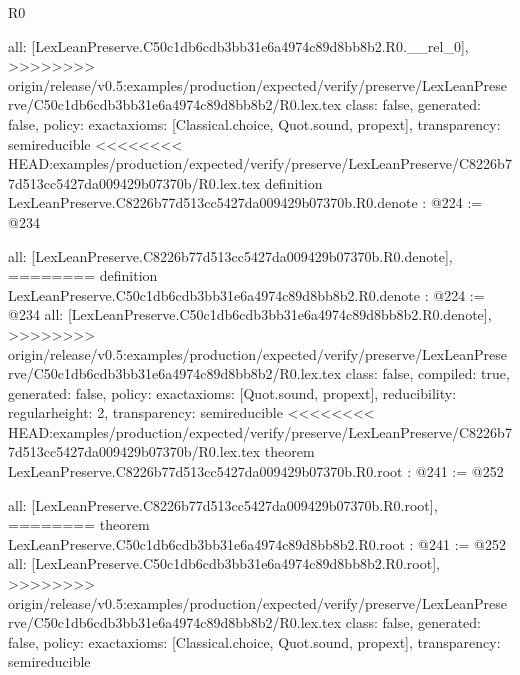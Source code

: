 \begin{lexlean}{R0}
\begin{coremodule}
{{{{  all: [LexLeanPreserve.C50c1db6cdb3bb31e6a4974c89d8bb8b2.R0.__rel_0],
>>>>>>>> origin/release/v0.5:examples/production/expected/verify/preserve/LexLeanPreserve/C50c1db6cdb3bb31e6a4974c89d8bb8b2/R0.lex.tex
  class: false,
  generated: false,
  policy: exact{axioms: [Classical.choice, Quot.sound, propext]},
  transparency: semireducible
}
<<<<<<<< HEAD:examples/production/expected/verify/preserve/LexLeanPreserve/C8226b77d513cc5427da009429b07370b/R0.lex.tex
definition LexLeanPreserve.C8226b77d513cc5427da009429b07370b.R0.denote : @224 := @234 {
  all: [LexLeanPreserve.C8226b77d513cc5427da009429b07370b.R0.denote],
========
definition LexLeanPreserve.C50c1db6cdb3bb31e6a4974c89d8bb8b2.R0.denote : @224 := @234 {
  all: [LexLeanPreserve.C50c1db6cdb3bb31e6a4974c89d8bb8b2.R0.denote],
>>>>>>>> origin/release/v0.5:examples/production/expected/verify/preserve/LexLeanPreserve/C50c1db6cdb3bb31e6a4974c89d8bb8b2/R0.lex.tex
  class: false,
  compiled: true,
  generated: false,
  policy: exact{axioms: [Quot.sound, propext]},
  reducibility: regular{height: 2},
  transparency: semireducible
}
<<<<<<<< HEAD:examples/production/expected/verify/preserve/LexLeanPreserve/C8226b77d513cc5427da009429b07370b/R0.lex.tex
theorem LexLeanPreserve.C8226b77d513cc5427da009429b07370b.R0.root : @241 := @252 {
  all: [LexLeanPreserve.C8226b77d513cc5427da009429b07370b.R0.root],
========
theorem LexLeanPreserve.C50c1db6cdb3bb31e6a4974c89d8bb8b2.R0.root : @241 := @252 {
  all: [LexLeanPreserve.C50c1db6cdb3bb31e6a4974c89d8bb8b2.R0.root],
>>>>>>>> origin/release/v0.5:examples/production/expected/verify/preserve/LexLeanPreserve/C50c1db6cdb3bb31e6a4974c89d8bb8b2/R0.lex.tex
  class: false,
  generated: false,
  policy: exact{axioms: [Classical.choice, Quot.sound, propext]},
  transparency: semireducible
}

}}}}}
\end{coremodule}
\end{lexlean}
